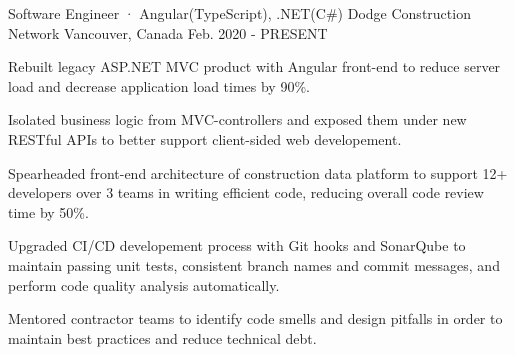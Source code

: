 

\begin{cventries}

\cventry
  {Software Engineer · Angular(TypeScript), .NET(C\#)} %
  {Dodge Construction Network} %
  {Vancouver, Canada} %
  {Feb. 2020 - PRESENT} %
  {
    \begin{cvitems} %
      \item {Rebuilt legacy ASP.NET MVC product with Angular front-end to reduce server load and decrease application load times by 90\%.}
      \item {Isolated business logic from MVC-controllers and exposed them under new RESTful APIs to better support client-sided web developement.}
      \item {Spearheaded front-end architecture of construction data platform to support 12+ developers over 3 teams in writing efficient code, reducing overall code review time by 50\%.}
      \item {Upgraded CI/CD developement process with Git hooks and SonarQube to maintain passing unit tests, consistent branch names and commit messages, and perform code quality analysis automatically.}
      \item {Mentored contractor teams to identify code smells and design pitfalls in order to maintain best practices and reduce technical debt.}
    \end{cvitems}
  }


\end{cventries}

